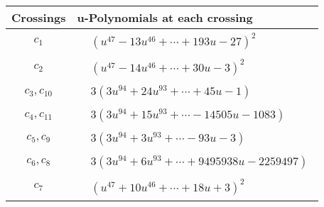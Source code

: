 \documentclass[1p]{elsarticle_modified}
\theoremstyle{definition}
\begin{document}
\begin{tabular}{m{50pt}|m{274pt}}
Crossings & \hspace{64pt}u-Polynomials at each crossing \\
\hline $$\begin{aligned}c_{1}\end{aligned}$$&$\begin{aligned}
&(u^{47}-13 u^{46}+\cdots+193 u-27)^{2}
\end{aligned}$\\
\hline $$\begin{aligned}c_{2}\end{aligned}$$&$\begin{aligned}
&(u^{47}-14 u^{46}+\cdots+30 u-3)^{2}
\end{aligned}$\\
\hline $$\begin{aligned}c_{3},c_{10}\end{aligned}$$&$\begin{aligned}
&3(3 u^{94}+24 u^{93}+\cdots+45 u-1)
\end{aligned}$\\
\hline $$\begin{aligned}c_{4},c_{11}\end{aligned}$$&$\begin{aligned}
&3(3 u^{94}+15 u^{93}+\cdots-14505 u-1083)
\end{aligned}$\\
\hline $$\begin{aligned}c_{5},c_{9}\end{aligned}$$&$\begin{aligned}
&3(3 u^{94}+3 u^{93}+\cdots-93 u-3)
\end{aligned}$\\
\hline $$\begin{aligned}c_{6},c_{8}\end{aligned}$$&$\begin{aligned}
&3(3 u^{94}+6 u^{93}+\cdots+9495938 u-2259497)
\end{aligned}$\\
\hline $$\begin{aligned}c_{7}\end{aligned}$$&$\begin{aligned}
&(u^{47}+10 u^{46}+\cdots+18 u+3)^{2}
\end{aligned}$\\
\hline
\end{tabular}\\~\\
\end{document}
